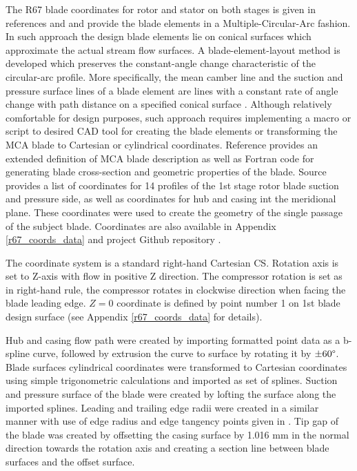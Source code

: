 The R67 blade coordinates for rotor and stator on both stages is given in references \citep{r67design} and \citep{r67performance} and provide the blade elements in a Multiple-Circular-Arc fashion. In such approach the design blade elements lie on conical surfaces which approximate the actual stream flow surfaces. A blade-element-layout method is developed which preserves the constant-angle change characteristic of the circular-arc profile. More specifically, the mean camber line and the suction and pressure surface lines of a blade element are lines with a constant rate of angle change with path distance on a specified conical surface \citep{bladecompose}. Although relatively comfortable for design purposes, such approach requires implementing a macro or script to desired CAD tool for creating the blade elements or transforming the MCA blade to Cartesian or cylindrical coordinates. Reference \citep{bladecompose} provides an extended definition of MCA blade description as well as Fortran code for generating blade cross-section and geometric properties of the blade. Source \citep{r67laser} provides a list of coordinates for 14 profiles of the 1st stage rotor blade suction and pressure side, as well as coordinates for hub and casing int the meridional plane. These coordinates were used to create the geometry of the single passage of the subject blade. Coordinates are also available in Appendix \ref{r67_coords_data} and project Github repository \citep{github}.

The coordinate system is a standard right-hand Cartesian CS. Rotation axis is set to Z-axis with flow in positive Z direction. The compressor rotation is set as in right-hand rule, the compressor rotates in clockwise direction when facing the blade leading edge. $Z = 0$ coordinate is defined by point number 1 on 1st blade design surface (see Appendix \ref{r67_coords_data} for details). 


Hub and casing flow path were created by importing formatted point data as a b-spline curve, followed by extrusion the curve to surface by rotating it by $\pm 60 \degree$. Blade surfaces cylindrical coordinates were transformed to Cartesian coordinates using simple trigonometric calculations and imported as set of splines. Suction and pressure surface of the blade were created by lofting the surface along the imported splines. Leading and trailing edge radii were created in a similar manner with use of edge radius and edge tangency points given in \citep{r67laser}. Tip gap of the blade was created by offsetting the casing surface by 1.016 mm in the normal direction towards the rotation axis and creating a section line between blade surfaces and the offset surface.

